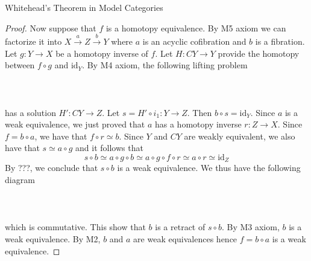 \documentclass[a4paper]{article}
\begin{document}
\begin{thm}{Whitehead's Theorem in Model Categories}{}
\begin{proof}
Now suppose that $f$ is a homotopy equivalence. By M5 axiom we can factorize it into $X\overset{a}{\longrightarrow}Z\overset{b}{\longrightarrow}Y$ where $a$ is an acyclic cofibration and $b$ is a fibration. Let $g:Y\to X$ be a homotopy inverse of $f$. Let $H:CY\to Y$ provide the homotopy between $f\circ g$ and $\text{id}_Y$. By M4 axiom, the following lifting problem \\~\\
\\~\\ 
has a solution $H':CY\to Z$. Let $s=H'\circ i_1:Y\to Z$. Then $b\circ s=\text{id}_Y$. Since $a$ is a weak equivalence, we just proved that $a$ has a homotopy inverse $r:Z\to X$. Since $f=b\circ a$, we have that $f\circ r\simeq b$. Since $Y$ and $CY$ are weakly equivalent, we also have that $s\simeq a\circ g$ and it follows that $$s\circ b\simeq a\circ g\circ b\simeq a\circ g\circ f\circ r\simeq a\circ r\simeq\text{id}_Z$$ By ???, we conclude that $s\circ b$ is a weak equivalence. We thus have the following diagram \\~\\
\\~\\ 
which is commutative. This show that $b$ is a retract of $s\circ b$. By M3 axiom, $b$ is a weak equivalence. By M2, $b$ and $a$ are weak equivalences hence $f=b\circ a$ is a weak equivalence. 
\end{proof}
\end{thm}
\end{document}

